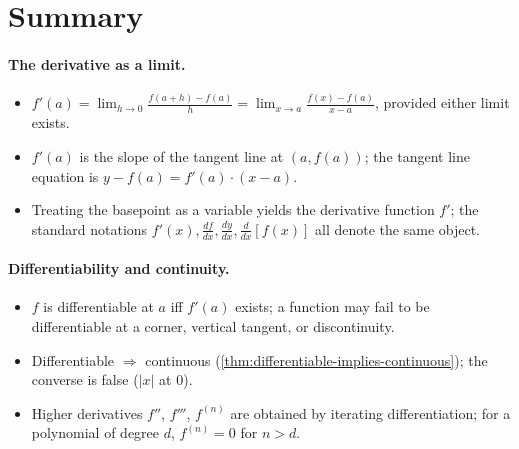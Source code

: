 \section*{Summary}

\paragraph{The derivative as a limit.}
\begin{itemize}
    \item \(\displaystyle f'(a) = \lim_{h \to 0} \frac{f(a + h) - f(a)}{h} = \lim_{x \to a} \frac{f(x) - f(a)}{x - a}\), provided either limit exists.
    \item \(f'(a)\) is the slope of the tangent line at \((a, f(a))\); the tangent line equation is \(y - f(a) = f'(a) \cdot (x - a)\).
    \item Treating the basepoint as a variable yields the derivative function \(f'\); the standard notations \(f'(x), \frac{df}{dx}, \frac{dy}{dx}, \frac{d}{dx}[f(x)]\) all denote the same object.
\end{itemize}

\paragraph{Differentiability and continuity.}
\begin{itemize}
    \item \(f\) is differentiable at \(a\) iff \(f'(a)\) exists; a function may fail to be differentiable at a corner, vertical tangent, or discontinuity.
    \item Differentiable \(\Rightarrow\) continuous (\cref{thm:differentiable-implies-continuous}); the converse is false (\(\lvert x \rvert\) at \(0\)).
    \item Higher derivatives \(f''\), \(f'''\), \(f^{(n)}\) are obtained by iterating differentiation; for a polynomial of degree \(d\), \(f^{(n)} = 0\) for \(n > d\).
\end{itemize}

